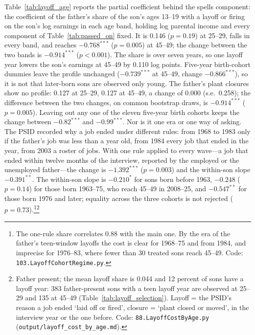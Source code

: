 Table~\ref{tab:layoff_age} reports the partial coefficient behind the spells component: the coefficient of the
father's share of the son's ages 13--19 with a layoff or firing on the son's log earnings in each age band, holding log
parental income and every component of Table~\ref{tab:passed_on} fixed. It is 0.146 ($p = 0.19$) at 25--29, falls in
every band, and reaches $-0.768^{***}$ ($p = 0.005$) at 45--49; the change between the two bands is $-0.914^{***}$
($p<0.001$). The share is over seven years, so one layoff year lowers the son's earnings at 45--49 by 0.110 log points.
Five-year birth-cohort dummies leave the profile unchanged ($-0.739^{***}$ at 45--49, change $-0.866^{***}$), so it is
not that later-born sons are observed only young. The father's plant closures show no profile: 0.127 at 25--29, 0.127
at 45--49, a change of 0.000 (s.e.\ 0.258); the difference between the two changes, on common bootstrap draws, is
$-0.914^{***}$ ($p = 0.005$). Leaving out any one of the eleven five-year birth cohorts keeps the change between
$-0.82^{***}$ and $-0.99^{***}$. Nor is it one era or one way of asking. The PSID recorded why a job ended under
different rules: from 1968 to 1983 only if the father's job was less than a year old, from 1984 every job that ended
in the year, from 2003 a roster of jobs. With one rule applied to every wave---a job that ended within twelve months of
the interview, reported by the employed or the unemployed father---the change is $-1.392^{***}$ ($p = 0.003$) and the
within-son slope $-0.391^{**}$. The within-son slope is $-0.210^{*}$ for sons born before 1963, $-0.248$ ($p = 0.14$)
for those born 1963--75, who reach 45--49 in 2008--25, and $-0.547^{**}$ for those born 1976 and later; equality across
the three cohorts is not rejected ($p = 0.73$).\footnote{The one-rule share correlates 0.88 with the main one. By the
era of the father's teen-window layoffs the cost is clear for 1968--75 and from 1984, and imprecise for 1976--83, where
fewer than 30 treated sons reach 45--49. Code: \texttt{103.LayoffCohortRegime.py}.}\footnote{Father present; the mean layoff share is 0.044 and 12 percent of sons have a
layoff year: 383 father-present sons with a teen layoff year are observed at 25--29 and 135 at 45--49 (Table~\ref{tab:layoff_selection}). Layoff = the PSID's reason a job ended `laid off or fired', closure = `plant closed or moved',
in the interview year or the one before. Code: \texttt{88.LayoffCostByAge.py} (\texttt{output/layoff\_cost\_by\_age.md}).}



